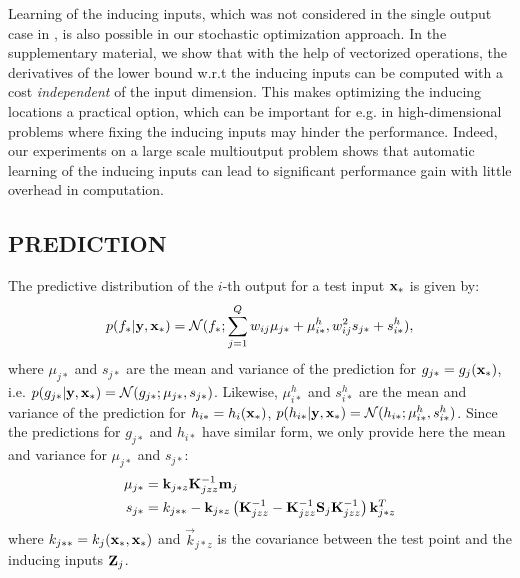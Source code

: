 Learning of the inducing inputs, which was not considered in the single output case in \citep{hensmangaussian}, is also possible in our stochastic optimization approach.
In the supplementary material, we show that with the help of vectorized operations, the derivatives of the lower bound w.r.t the inducing inputs can be computed with a cost \emph{independent} of the input dimension.
This makes optimizing the inducing locations a practical option, which can be important for e.g. in high-dimensional problems where fixing the inducing inputs may hinder the performance.
Indeed, our experiments on a large scale multioutput problem shows that automatic learning of the inducing inputs can lead to significant performance gain with little overhead in computation. 

\subsection{PREDICTION}
The predictive distribution of the $i$-th output for a test input $\mathbf{x}_*$ is given by:
\begin{align}
p(f_* | \mathbf{y}, \mathbf{x}_*) = \mathcal{N}(f_*; \sum_{j=1}^Q w_{ij} \mu_{j*} + \mu^h_{i*}, w_{ij}^2 s_{j*} + s^h_{i*}), 
\end{align}
where $\mu_{j*}$ and $s_{j*}$ are the mean and variance of the prediction for $g_{j*} = g_j(\mathbf{x}_*)$, i.e. $p(g_{j*} | \mathbf{y}, \mathbf{x}_*) = \mathcal{N}(g_{j*}; \mu_{j*}, s_{j*})$.
Likewise, $\mu^h_{i*}$ and $s^h_{i*}$ are the mean and variance of the prediction for $h_{i*} = h_i(\mathbf{x}_*)$, $p(h_{i*} | \mathbf{y}, \mathbf{x}_*) = \mathcal{N}(h_{i*}; \mu^h_{i*}, s^h_{i*})$.
Since the predictions for $g_{j*}$ and $h_{i*}$ have similar form, we only provide here the mean and variance for $\mu_{j*}$ and $s_{j*}$: 
\begin{align}
\mu_{j*} &= \mathbf{k}_{j*z} \mathbf{K}_{jzz}^{-1} \mathbf{m}_j \\ s_{j*} &= k_{j**} - \mathbf{k}_{j*z} \left(\mathbf{K}_{jzz}^{-1} - \mathbf{K}_{jzz}^{-1} \mathbf{S}_j \mathbf{K}_{jzz}^{-1} \right) \mathbf{k}_{j*z}^T
\end{align}
where $k_{j**} = k_j(\mathbf{x}_*, \mathbf{x}_*)$ and $\vec{k}_{j*z}$ is the covariance between the test point and the inducing inputs $\mathbf{Z}_j$.
 
